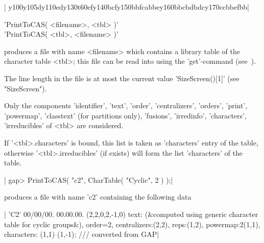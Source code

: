 |    y100y105dy110edy130t60efy140bcfy150bbfcabbey160bbcbdbdcy170ccbbefbb|

%

'PrintToCAS( <filename>, <tbl> )'\\
'PrintToCAS( <tbl>, <filename> )'

produces a file with name <filename> which contains a {\CAS} library table
of the {\GAP} character table <tbl>; this file can be read into {\CAS}
using the 'get'-command (see~\cite{NPP84}).

The line length in the file is at most the current value 'SizeScreen()[1]'
(see "SizeScreen").

Only the components 'identifier', 'text', 'order', 'centralizers',
'orders', 'print', 'powermap', 'classtext' (for partitions only),
'fusions', 'irredinfo', 'characters', 'irreducibles' of <tbl> are
considered.

If '<tbl>.characters' is bound, this list is taken as 'characters' entry
of the {\CAS} table, otherwise '<tbl>.irreducibles' (if exists) will form
the list 'characters' of the {\CAS} table.

|    gap> PrintToCAS( "c2", CharTable( "Cyclic", 2 ) );|

produces a file with name 'c2' containing the following data\:

|    'C2'
    00/00/00. 00.00.00.
    (2,2,0,2,-1,0)
    text:
    (&computed using generic character table for cyclic groups&),
    order=2,
    centralizers:(2,2),
    reps:(1,2),
    powermap:2(1,1),
    characters:
    (1,1)
    (1,-1);
    /// converted from GAP|


